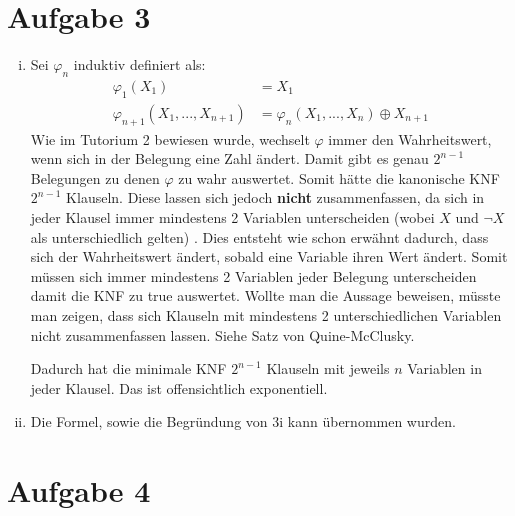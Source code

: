 \documentclass[a4paper,10pt]{article}
\begin{document}
\section*{Aufgabe 3}

\begin{enumerate}[(i)]
\item Sei $\varphi_n$ induktiv definiert als:
\begin{align*}
\varphi_1(X_1) &= X_1 \\
\varphi_{n+1}(X_1,...,X_{n+1}) &= \varphi_n(X_1,...,X_n) \oplus X_{n+1}
\end{align*}
Wie im Tutorium 2 bewiesen wurde, wechselt $\varphi$ immer den Wahrheitswert, wenn sich in der Belegung eine Zahl ändert. Damit gibt es genau $2^{n-1}$ Belegungen zu denen $\varphi$ zu wahr auswertet. Somit hätte die kanonische KNF $2^{n-1}$ Klauseln. Diese lassen sich jedoch \textbf{nicht} zusammenfassen, da sich in jeder Klausel immer mindestens 2 Variablen unterscheiden (wobei $X$ und $\lnot X$ als unterschiedlich gelten) . Dies entsteht wie schon erwähnt dadurch, dass sich der Wahrheitswert ändert, sobald eine Variable ihren Wert ändert. Somit müssen sich immer mindestens 2 Variablen jeder Belegung unterscheiden damit die KNF zu \textsf{true} auswertet. Wollte man die Aussage beweisen, müsste man zeigen, dass sich Klauseln mit mindestens 2 unterschiedlichen Variablen nicht zusammenfassen lassen. Siehe Satz von Quine-McClusky.

 Dadurch hat die minimale KNF $2^{n-1}$ Klauseln mit jeweils $n$ Variablen in jeder Klausel. Das ist offensichtlich exponentiell.

\item Die Formel, sowie die Begründung von 3i kann übernommen wurden.
\end{enumerate}

\section*{Aufgabe 4}
\end{document}
